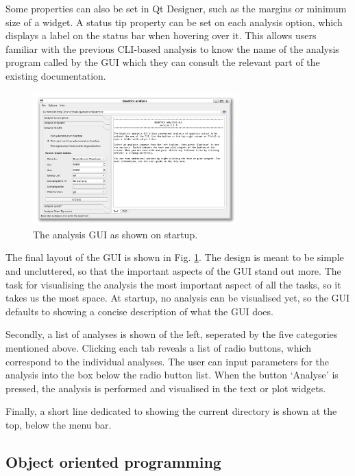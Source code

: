 \documentclass[12pt]{article}
\begin{document}
Some properties can also be set in Qt Designer, such as the margins or minimum size of a widget. A status tip property can be set on each analysis option, which displays a label on the status bar when hovering over it. This allows users familiar with the previous CLI-based analysis to know the name of the analysis program called by the GUI which they can consult the relevant part of the existing documentation.

\begin{figure}[h]
    \centering
    \includegraphics[width=0.7\textwidth]{img/analysis_gui.png}
    \caption{The analysis GUI as shown on startup.}
    \label{fig:analysis_gui}
\end{figure}

The final layout of the GUI is shown in Fig. \ref{fig:analysis_gui}. 
The design is meant to be simple and uncluttered, so that the important aspects of the GUI stand out more. The task for visualising the analysis the most important aspect of all the tasks, so it takes us the most space. At startup, no analysis can be visualised yet, so the GUI defaults to showing a concise description of what the GUI does.

Secondly, a list of analyses is shown of the left, seperated by the five categories mentioned above. Clicking each tab reveals a list of radio buttons, which correspond to the individual analyses. The user can input parameters for the analysis into the box below the radio button list. When the button `Analyse' is pressed, the analysis is performed and visualised in the text or plot widgets.

Finally, a short line dedicated to showing the current directory is shown at the top, below the menu bar.

\subsection{Object oriented programming}\label{ssec:oop}
\end{document}
